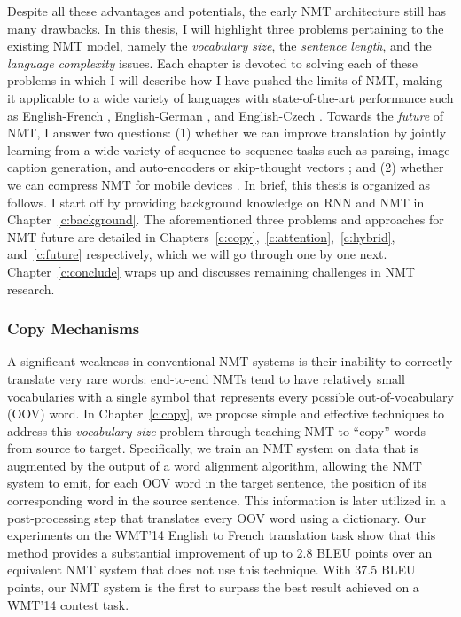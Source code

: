 Despite all these advantages and potentials, the early NMT architecture
\cite{sutskever14,cho14} still has many drawbacks. In this thesis, I will
highlight three problems pertaining to the existing NMT model, namely the
{\it vocabulary size}, the {\it sentence length}, and the {\it
language complexity} issues. Each chapter is devoted to solving each of these
problems in which I will describe how I have pushed the limits of NMT, making it
applicable to a wide variety of languages with state-of-the-art performance such as
English-French \cite{luong15}, English-German \cite{luong15attn,luong15iwslt}, and
English-Czech \cite{luong16}. Towards the {\it future} of
NMT, I answer two questions: (1) whether we can improve translation by jointly
learning from a wide variety of sequence-to-sequence tasks such as parsing,
image caption generation, and auto-encoders or skip-thought vectors
\cite{luong16iclr}; and (2)
whether we can compress NMT for mobile devices \cite{see16}.
In brief, this thesis is organized as follows. I start off by providing background knowledge on RNN and NMT
in Chapter~\ref{c:background}. 
The aforementioned three problems and approaches for NMT future are detailed in
Chapters~\ref{c:copy},~\ref{c:attention},~\ref{c:hybrid}, and~\ref{c:future}
respectively, which we will go through one by one next.
Chapter~\ref{c:conclude} wraps up and discusses remaining challenges in NMT research.

\subsubsection*{Copy Mechanisms} 
A significant weakness in conventional NMT 
systems is their inability to correctly translate very rare words:  
end-to-end NMTs tend to have relatively small vocabularies with a single
\unk{} symbol that represents every possible out-of-vocabulary (OOV) word. In
Chapter~\ref{c:copy}, we propose simple and effective techniques to address this
{\it vocabulary size} problem through teaching NMT to ``copy'' words from source to
target. Specifically, we train an NMT system on data that is augmented by the output of a word 
alignment algorithm, allowing the NMT system to emit, for each OOV word
in the target sentence, the position of its corresponding word in the source sentence.
This information is later utilized in a
post-processing step that translates every OOV word using a dictionary.  Our
experiments on the WMT'14 English to French translation task show that this 
method provides a substantial improvement of up to 2.8 BLEU points over an
equivalent NMT system that does not use this technique. 
With 37.5 BLEU points, our NMT system is the first to surpass 
the best result achieved on a WMT'14 contest task.

